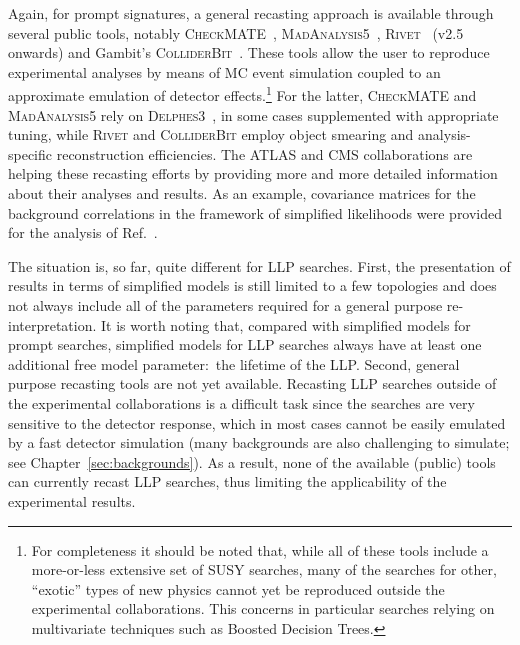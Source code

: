 Again, for prompt signatures, a general recasting approach is available through several public 
tools, notably \textsc{CheckMATE}~\cite{Drees:2013wra,Dercks:2016npn}, \textsc{MadAnalysis5}~\cite{Conte:2014zja,Dumont:2014tja}, 
\textsc{Rivet}~{\bf\cite{Buckley:2010ar}} (v2.5 onwards) and Gambit's \textsc{ColliderBit}~\cite{Balazs:2017moi}.
These tools allow the user to reproduce experimental analyses by means of MC event simulation coupled to 
an approximate emulation of detector effects.\footnote{For completeness it should be noted that, while all of these tools include a more-or-less 
extensive set of SUSY searches, many of the searches for other, ``exotic'' types of new physics cannot yet be reproduced outside the experimental collaborations. This concerns in particular searches relying on multivariate techniques such as Boosted Decision Trees.} 
For the latter, \textsc{CheckMATE} and \textsc{MadAnalysis5} rely on \textsc{Delphes3}~\cite{deFavereau:2013fsa}, 
in some cases supplemented with appropriate tuning, 
while \textsc{Rivet} and \textsc{ColliderBit} employ object smearing and analysis-specific reconstruction efficiencies. 
The ATLAS and CMS collaborations are helping these recasting efforts by providing more and more 
detailed information about their analyses and results. As an example, covariance matrices for the background correlations in the framework of simplified likelihoods were provided for the analysis of Ref.~\cite{CMS-NOTE-2017-001}.

The situation is, so far, quite different for LLP searches. 
First, the presentation of results in terms of simplified models 
is still limited to a few topologies and does not always include all of the
parameters required for a general purpose re-interpretation. 
It is worth noting that, compared with simplified models for prompt searches, simplified models 
for LLP searches always have at least one additional free model parameter:~the lifetime of the LLP. 
Second, general purpose recasting tools are not yet available.
Recasting LLP searches outside of the experimental collaborations is  a
difficult task since the searches are very sensitive to the detector response, which in most cases 
cannot be easily emulated  by a fast detector simulation (many backgrounds are also challenging to simulate; see 
Chapter~\ref{sec:backgrounds}).
As a result, none of the available (public) tools can currently recast
LLP searches, thus limiting the applicability of the experimental
results. 



